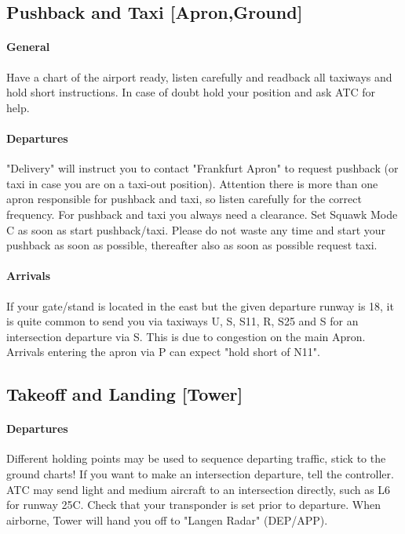 \subsection[GND]{Pushback and Taxi [Apron,Ground]}
\paragraph{General}
Have a chart of the airport ready, listen carefully and readback all taxiways and hold short instructions. In case of doubt hold your position and ask ATC for help.

\paragraph{Departures}
"Delivery" will instruct you to contact "Frankfurt Apron" to request pushback (or taxi in case you are on a taxi-out position). Attention there is more than one apron responsible for pushback and taxi, so listen carefully for the correct frequency.
For pushback and taxi you always need a clearance.
Set Squawk Mode C as soon as start pushback/taxi.
Please do not waste any time and start your pushback as soon as possible, thereafter also as soon as possible request taxi.

\paragraph{Arrivals}
If your gate/stand is located in the east but the given departure runway is 18, it is quite common to send
you via taxiways U, S, S11, R, S25 and S for an intersection departure via S. This is due to congestion on the main Apron.
Arrivals entering the apron via P can expect "hold short of N11".

\subsection[TWR]{Takeoff and Landing [Tower]}

\paragraph{Departures}
Different holding points may be used to sequence departing traffic, stick to the ground charts!
If you want to make an intersection departure, tell the controller. ATC may send light and medium
aircraft to an intersection directly, such as L6 for runway 25C.
Check that your transponder is set prior to departure.
When airborne, Tower will hand you off to "Langen Radar" (DEP/APP). 


